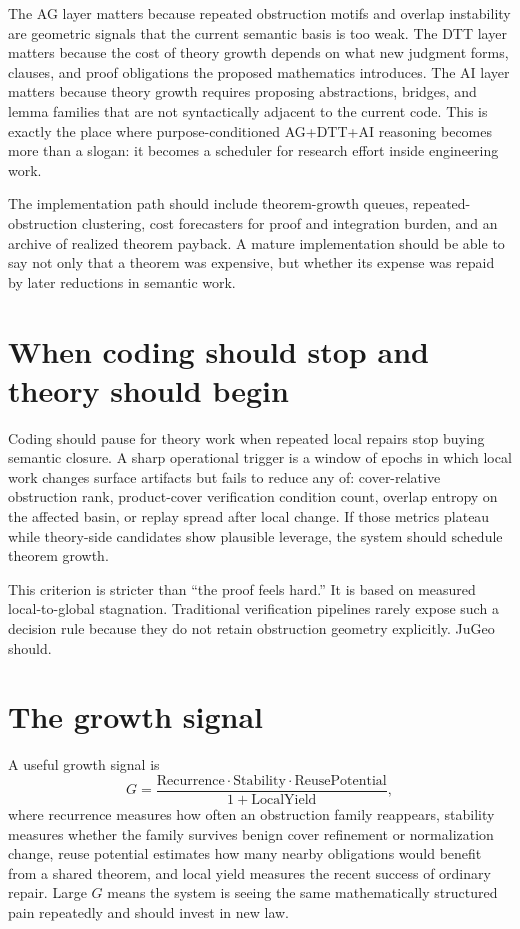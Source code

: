\documentclass[11pt]{report}
\begin{document}
The AG layer matters because repeated obstruction motifs and overlap instability are geometric signals that the current semantic basis is too weak. The DTT layer matters because the cost of theory growth depends on what new judgment forms, clauses, and proof obligations the proposed mathematics introduces. The AI layer matters because theory growth requires proposing abstractions, bridges, and lemma families that are not syntactically adjacent to the current code. This is exactly the place where purpose-conditioned AG+DTT+AI reasoning becomes more than a slogan: it becomes a scheduler for research effort inside engineering work.

The implementation path should include theorem-growth queues, repeated-obstruction clustering, cost forecasters for proof and integration burden, and an archive of realized theorem payback. A mature implementation should be able to say not only that a theorem was expensive, but whether its expense was repaid by later reductions in semantic work.
\section{When coding should stop and theory should begin}
Coding should pause for theory work when repeated local repairs stop buying semantic closure. A sharp operational trigger is a window of epochs in which local work changes surface artifacts but fails to reduce any of: cover-relative obstruction rank, product-cover verification condition count, overlap entropy on the affected basin, or replay spread after local change. If those metrics plateau while theory-side candidates show plausible leverage, the system should schedule theorem growth.

This criterion is stricter than “the proof feels hard.” It is based on measured local-to-global stagnation. Traditional verification pipelines rarely expose such a decision rule because they do not retain obstruction geometry explicitly. JuGeo should.

\section{The growth signal}
A useful growth signal is
\[
G = \frac{\mathrm{Recurrence}\cdot \mathrm{Stability}\cdot \mathrm{ReusePotential}}{1 + \mathrm{LocalYield}},
\]
where recurrence measures how often an obstruction family reappears, stability measures whether the family survives benign cover refinement or normalization change, reuse potential estimates how many nearby obligations would benefit from a shared theorem, and local yield measures the recent success of ordinary repair. Large $G$ means the system is seeing the same mathematically structured pain repeatedly and should invest in new law.
\end{document}
